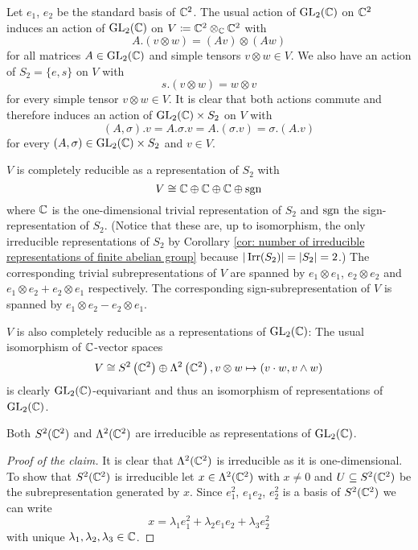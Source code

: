 \begin{expl}
Let $e_1$, $e_2$ be the standard basis of $\mathbb{C}^2$.
The usual action of $\operatorname{GL}_2(\mathbb{C})$ on $\mathbb{C}^2$ induces an action of $\operatorname{GL}_2(\mathbb{C})$ on $V \coloneqq \mathbb{C}^2 \otimes_{\mathbb{C}} \mathbb{C}^2$ with
  \[
      A.(v \otimes w)
    = (Av) \otimes (Aw)
  \]
  for all matrices $A \in \operatorname{GL}_2(\mathbb{C})$ and simple tensors $v \otimes w \in V$.
  We also have an action of $S_2 = \{e, s\}$ on $V$ with
  \[
      s.(v \otimes w)
    = w \otimes v
  \]
  for every simple tensor $v \otimes w \in V$.
  It is clear that both actions commute and therefore induces an action of $\operatorname{GL}_2(\mathbb{C}) \times S_2$ on $V$ with
  \[
      (A,\sigma).v
    = A.\sigma.v
    = A.(\sigma.v)
    = \sigma.(A.v)
  \]
  for every $(A,\sigma) \in \operatorname{GL}_2(\mathbb{C}) \times S_2$ and $v \in V$.
  
  $V$ is completely reducible as a representation of $S_2$ with
  \[
                  V
    \cong         \mathbb{C}
          \oplus  \mathbb{C}
          \oplus  \mathbb{C}
          \oplus  \operatorname{sgn}
  \]
  where $\mathbb{C}$ is the one-dimensional trivial representation of $S_2$ and $\operatorname{sgn}$ the sign-representation of $S_2$.
  (Notice that these are, up to isomorphism, the only irreducible representations of $S_2$ by Corollary \ref{cor: number of irreducible representations of finite abelian group} because $|\operatorname{Irr}(S_2)| = |S_2| = 2$.)
  The corresponding trivial subrepresentations of $V$ are spanned by $e_1 \otimes e_1$, $e_2 \otimes e_2$ and $e_1 \otimes e_2 + e_2 \otimes e_1$ respectively.
  The corresponding sign-subrepresentation of $V$ is spanned by $e_1 \otimes e_2 - e_2 \otimes e_1$.
  
  $V$ is also completely reducible as a representations of $\operatorname{GL}_2(\mathbb{C})$:
  The usual isomorphism of $\mathbb{C}$-vector spaces
  \[
            V
    \cong   S^2\left( \mathbb{C}^2 \right)  \oplus  \Lambda^2\left( \mathbb{C}^2 \right),
            v \otimes w
    \mapsto (v \cdot w, v \wedge w)
  \]
  is clearly $\operatorname{GL}_2(\mathbb{C})$-equivariant and thus an isomorphism of representations of $\operatorname{GL}_2(\mathbb{C})$.
  
  \begin{claim}
    Both $S^2(\mathbb{C}^2)$ and $\Lambda^2(\mathbb{C}^2)$ are irreducible as representations of $\operatorname{GL}_2(\mathbb{C})$.
  \end{claim}
  \begin{proof}[Proof of the claim]
    It is clear that $\Lambda^2(\mathbb{C}^2)$ is irreducible as it is one-dimensional.
    To show that $S^2(\mathbb{C}^2)$ is irreducible let $x \in \Lambda^2(\mathbb{C}^2)$ with $x \neq 0$ and $U \subseteq S^2(\mathbb{C}^2)$ be the subrepresentation generated by $x$.
    Since $e_1^2$, $e_1 e_2$, $e_2^2$ is a basis of $S^2(\mathbb{C}^2)$ we can write
    \[
        x
      =   \lambda_1 e_1^2
        + \lambda_2 e_1 e_2
        + \lambda_3 e_2^2
    \]
    with unique $\lambda_1, \lambda_2, \lambda_3 \in \mathbb{C}$.
    

\end{proof}
\end{expl}
